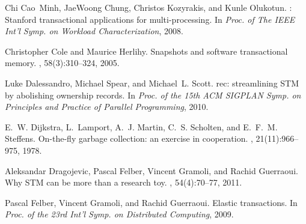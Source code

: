 \begin{thebibliography}{99}
{
Chi Cao~Minh, JaeWoong Chung, Christos Kozyrakis, and Kunle Olukotun.
: Stanford transactional applications for multi-processing.
\newblock In {\em Proc. of The IEEE Int'l Symp. on Workload Characterization},
  2008.

Christopher Cole and Maurice Herlihy.
\newblock Snapshots and software transactional memory.
, 58(3):310--324, 2005.

Luke Dalessandro, Michael Spear, and Michael~L. Scott.
rec: streamlining {STM} by abolishing ownership records.
\newblock In {\em Proc. of the 15th ACM SIGPLAN Symp. on Principles and
  Practice of Parallel Programming}, 2010.


E.~W. Dijkstra, L.~Lamport, A.~J. Martin, C.~S. Scholten, and E.~F.~M.
  Steffens.
\newblock On-the-fly garbage collection: an exercise in cooperation.
, 21(11):966--975, 1978.



Aleksandar Dragojevic, Pascal Felber, Vincent Gramoli, and Rachid Guerraoui.
\newblock Why {STM} can be more than a research toy.
, 54(4):70--77, 2011.




Pascal Felber, Vincent Gramoli, and Rachid Guerraoui.
\newblock Elastic transactions.
\newblock In {\em Proc. of the 23rd Int'l Symp. on Distributed Computing},
  2009.

% 
% 
% 




}
\end{thebibliography}
